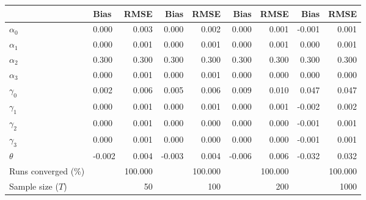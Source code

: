 
\begin{tabular}[t]{llrrrrrrr}
\toprule
  & Bias & RMSE & Bias & RMSE & Bias & RMSE & Bias & RMSE\\
\midrule
$\alpha_{0}$ & 0.000 & 0.003 & 0.000 & 0.002 & 0.000 & 0.001 & -0.001 & 0.001\\
$\alpha_{1}$ & 0.000 & 0.001 & 0.000 & 0.001 & 0.000 & 0.001 & 0.000 & 0.001\\
$\alpha_{2}$ & 0.300 & 0.300 & 0.300 & 0.300 & 0.300 & 0.300 & 0.300 & 0.300\\
$\alpha_{3}$ & 0.000 & 0.001 & 0.000 & 0.001 & 0.000 & 0.000 & 0.000 & 0.000\\
$\gamma_{0}$ & 0.002 & 0.006 & 0.005 & 0.006 & 0.009 & 0.010 & 0.047 & 0.047\\
$\gamma_{1}$ & 0.000 & 0.001 & 0.000 & 0.001 & 0.000 & 0.001 & -0.002 & 0.002\\
$\gamma_{2}$ & 0.000 & 0.001 & 0.000 & 0.000 & 0.000 & 0.000 & -0.001 & 0.001\\
$\gamma_{3}$ & 0.000 & 0.001 & 0.000 & 0.000 & 0.000 & 0.000 & -0.001 & 0.001\\
$\theta$ & -0.002 & 0.004 & -0.003 & 0.004 & -0.006 & 0.006 & -0.032 & 0.032\\
Runs converged (\%) &  & 100.000 &  & 100.000 &  & 100.000 &  & 100.000\\
Sample size ($T$) &  & 50 &  & 100 &  & 200 &  & 1000\\
\bottomrule
\end{tabular}
